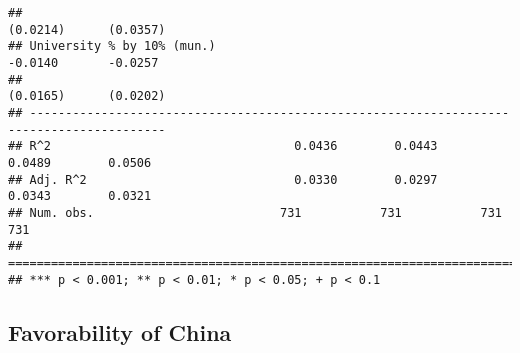 \documentclass[
]{article}
\begin{document}
\begin{verbatim}
##                                                                 (0.0214)      (0.0357)   
## University % by 10% (mun.)                                      -0.0140       -0.0257    
##                                                                 (0.0165)      (0.0202)   
## -----------------------------------------------------------------------------------------
## R^2                                  0.0436        0.0443        0.0489        0.0506    
## Adj. R^2                             0.0330        0.0297        0.0343        0.0321    
## Num. obs.                          731           731           731           731         
## =========================================================================================
## *** p < 0.001; ** p < 0.01; * p < 0.05; + p < 0.1
\end{verbatim}

\hypertarget{favorability-of-china-1}{%
\subsection{Favorability of China}\label{favorability-of-china-1}}
\end{document}
